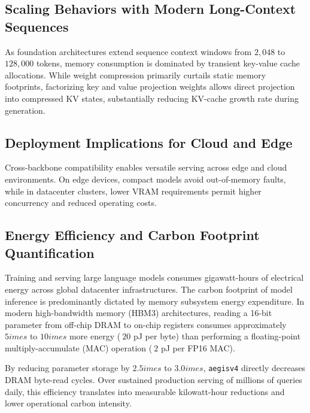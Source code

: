 \subsection{Scaling Behaviors with Modern Long-Context Sequences}
As foundation architectures extend sequence context windows from $2{,}048$ to $128{,}000$ tokens, memory consumption is dominated by transient key-value cache allocations. While weight compression primarily curtails static memory footprints, factorizing key and value projection weights allows direct projection into compressed KV states, substantially reducing KV-cache growth rate during generation.

\subsection{Deployment Implications for Cloud and Edge}
Cross-backbone compatibility enables versatile serving across edge and cloud environments. On edge devices, compact models avoid out-of-memory faults, while in datacenter clusters, lower VRAM requirements permit higher concurrency and reduced operating costs.

\subsection{Energy Efficiency and Carbon Footprint Quantification}
Training and serving large language models consumes gigawatt-hours of electrical energy across global datacenter infrastructures. The carbon footprint of model inference is predominantly dictated by memory subsystem energy expenditure. In modern high-bandwidth memory (HBM3) architectures, reading a 16-bit parameter from off-chip DRAM to on-chip registers consumes approximately $5	imes$ to $10	imes$ more energy ($~20$ pJ per byte) than performing a floating-point multiply-accumulate (MAC) operation ($~2$ pJ per FP16 MAC).

By reducing parameter storage by $2.5	imes$ to $3.0	imes$, \texttt{aegisv4} directly decreases DRAM byte-read cycles. Over sustained production serving of millions of queries daily, this efficiency translates into measurable kilowatt-hour reductions and lower operational carbon intensity.
